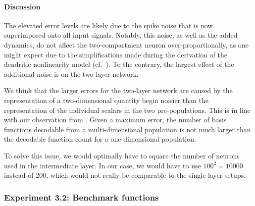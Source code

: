 \paragraph{Discussion}

The elevated error levels are likely due to the spike noise that is now superimposed onto all input signals.
Notably, this noise, as well as the added dynamics, do not affect the two-compartment neuron over-proportionally, as one might expect due to the simplifications made during the derivation of the dendritic nonlinearity model (cf.~).
To the contrary, the largest effect of the additional noise is on the two-layer network.

We think that the larger errors for the two-layer network are caused by the representation of a two-dimensional quantity begin noisier than the representation of the individual scalars in the two pre-populations.
This is in line with our observation from .
Given a maximum error, the number of basis functions decodable from a multi-dimensional population is not much larger than the decodable function count for a one-dimensional population.

To solve this issue, we would optimally have to square the number of neurons used in the intermediate layer.
In our case, we would have to use $100^2 = \num{10000}$ instead of \num{200}, which would not really be comparable to the single-layer setups.

\subsubsection{Experiment 3.2: Benchmark functions}

